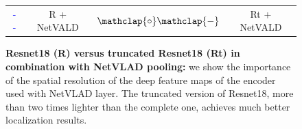 \begin{figure}
	\vspace{0.2cm}
	
	\begin{scriptsize}
	\begin{tabular}{c c c c}
		\textcolor{blue}{\large{- -}} & R + NetVALD & \textcolor{blue}{\large{$\mathclap{\circ} \mathclap{-}$}} & Rt + NetVALD \\
	\end{tabular}		
	\end{scriptsize}

	\caption{\label{fig:trunc_resnet} \textbf{Resnet18 (R) versus truncated Resnet18 (Rt) in combination with NetVLAD pooling:} we show the importance of the spatial resolution of the deep feature maps of the encoder used with NetVLAD layer. The truncated version of Resnet18, more than two times lighter than the complete one, achieves much better localization results.}
\end{figure}